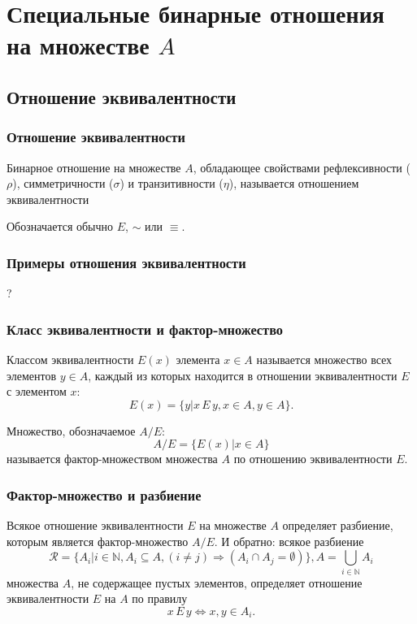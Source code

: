    
\section{Специальные бинарные отношения на множестве $A$}


\subsection{Отношение эквивалентности}
 
\begin{frame}
    \frametitle{Отношение эквивалентности}
    
    \begin{definition}
        Бинарное отношение на множестве $A$, обладающее свойствами рефлексивности ($\rho$), симметричности ($\sigma$) и транзитивности ($\eta$), называется отношением \alert{эквивалентности}
    \end{definition}
    
    Обозначается обычно $E$, $\sim$ или $\equiv$.
\end{frame}

\begin{frame}
    \frametitle{Примеры отношения эквивалентности}
    ?
\end{frame}

\begin{frame}
    \frametitle{Класс эквивалентности и фактор-множество}
    
    \begin{definition}
        \alert{Классом эквивалентности} $E(x)$ элемента $x\in A$ называется множество всех элементов $y\in A$, каждый из которых находится в отношении эквивалентности $E$ с элементом $x$:
        \[E(x)=\{y | x\,E\,y, x\in A, y\in A\}.\]
    \end{definition}

    \begin{definition}
        Множество, обозначаемое $A/E$:
        \[
            A/E=\{E(x)|x\in A\}
        \]
        называется \alert{фактор-множеством} множества $A$ по отношению эквивалентности $E$.
    \end{definition}
\end{frame}

\begin{frame}
    \frametitle{Фактор-множество и разбиение}
    
    \begin{theorem}
        Всякое отношение эквивалентности $E$ на множестве $A$ определяет \alert{разбиение}, которым является \alert{фактор-множество} $A/E$. И обратно: всякое разбиение 
        \[
            \mathcal{R}=\{A_i|i\in \mathbb{N}, A_i\subseteq A,(i\neq j)\Rightarrow (A_i\cap A_j=\emptyset)\},A=\bigcup_{i\in\mathbb{N}} A_i
        \]
        множества $A$, не содержащее пустых элементов, определяет отношение эквивалентности $E$ на $A$ по правилу 
        \begin{equation}
            x\,E\,y\Leftrightarrow x,y\in A_i.
            \label{eq:bo:equivByR}
        \end{equation}
    \end{theorem}
\end{frame}

